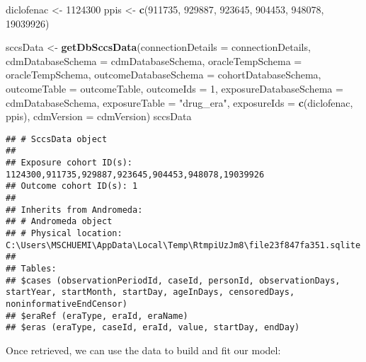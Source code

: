 \documentclass[
]{article}
\newenvironment{Shaded}{\begin{snugshade}}{\end{snugshade}}
\newcommand{\DataTypeTok}[1]{\textcolor[rgb]{0.13,0.29,0.53}{#1}}
\newcommand{\DecValTok}[1]{\textcolor[rgb]{0.00,0.00,0.81}{#1}}
\newcommand{\KeywordTok}[1]{\textcolor[rgb]{0.13,0.29,0.53}{\textbf{#1}}}
\newcommand{\NormalTok}[1]{#1}
\newcommand{\StringTok}[1]{\textcolor[rgb]{0.31,0.60,0.02}{#1}}
\begin{document}
\begin{Shaded}
\begin{Highlighting}[]
\NormalTok{diclofenac <-}\StringTok{ }\DecValTok{1124300}
\NormalTok{ppis <-}\StringTok{ }\KeywordTok{c}\NormalTok{(}\DecValTok{911735}\NormalTok{, }\DecValTok{929887}\NormalTok{, }\DecValTok{923645}\NormalTok{, }\DecValTok{904453}\NormalTok{, }\DecValTok{948078}\NormalTok{, }\DecValTok{19039926}\NormalTok{)}

\NormalTok{sccsData <-}\StringTok{ }\KeywordTok{getDbSccsData}\NormalTok{(}\DataTypeTok{connectionDetails =}\NormalTok{ connectionDetails,}
                          \DataTypeTok{cdmDatabaseSchema =}\NormalTok{ cdmDatabaseSchema,}
                          \DataTypeTok{oracleTempSchema =}\NormalTok{ oracleTempSchema,}
                          \DataTypeTok{outcomeDatabaseSchema =}\NormalTok{ cohortDatabaseSchema,}
                          \DataTypeTok{outcomeTable =}\NormalTok{ outcomeTable,}
                          \DataTypeTok{outcomeIds =} \DecValTok{1}\NormalTok{,}
                          \DataTypeTok{exposureDatabaseSchema =}\NormalTok{ cdmDatabaseSchema,}
                          \DataTypeTok{exposureTable =} \StringTok{"drug_era"}\NormalTok{,}
                          \DataTypeTok{exposureIds =} \KeywordTok{c}\NormalTok{(diclofenac, ppis),}
                          \DataTypeTok{cdmVersion =}\NormalTok{ cdmVersion)}
\NormalTok{sccsData}
\end{Highlighting}
\end{Shaded}

\begin{verbatim}
## # SccsData object
## 
## Exposure cohort ID(s): 1124300,911735,929887,923645,904453,948078,19039926
## Outcome cohort ID(s): 1
## 
## Inherits from Andromeda:
## # Andromeda object
## # Physical location:  C:\Users\MSCHUEMI\AppData\Local\Temp\RtmpiUzJm8\file23f847fa351.sqlite
## 
## Tables:
## $cases (observationPeriodId, caseId, personId, observationDays, startYear, startMonth, startDay, ageInDays, censoredDays, noninformativeEndCensor)
## $eraRef (eraType, eraId, eraName)
## $eras (eraType, caseId, eraId, value, startDay, endDay)
\end{verbatim}

Once retrieved, we can use the data to build and fit our model:
\end{document}
